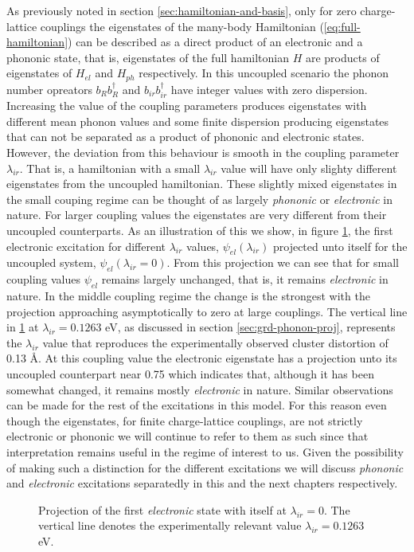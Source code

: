 As previously noted in section \ref{sec:hamiltonian-and-basis}, only for zero charge-lattice couplings the eigenstates of the many-body Hamiltonian (\ref{eq:full-hamiltonian}) can be described as a direct product of an electronic and a phononic state, that is, eigenstates of the full hamiltonian $H$ are products of eigenstates of $H_{el}$ and $H_{ph}$ respectively.
In this uncoupled scenario the phonon number opreators $b_Rb^\dagger_R$ and $b_{ir}b^\dagger_{ir}$ have integer values with zero dispersion.
Increasing the value of the coupling parameters produces eigenstates with different mean phonon values and some finite dispersion producing eigenstates that can not be separated as a product of phononic and electronic states.
However, the deviation from this behaviour is smooth in the coupling parameter $\lambda_{ir}$.
That is, a hamiltonian with a small $\lambda_{ir}$ value will have only slighty different eigenstates from the uncoupled hamiltonian.
These slightly mixed eigenstates in the small couping regime can be thought of as largely \textit{phononic} or \textit{electronic} in nature.
For larger coupling values the eigenstates are very different from their uncoupled counterparts.
As an illustration of this we show, in figure \ref{fig:electr-proj}, the first electronic excitation for different $\lambda_{ir}$ values, $\psi_{el}(\lambda_{ir})$ projected unto itself for the uncoupled system, $\psi_{el}(\lambda_{ir}=0)$.
From this projection we can see that for small coupling values $\psi_{el}$ remains largely unchanged, that is, it remains \textit{electronic} in nature.
In the middle coupling regime the change is the strongest with the projection approaching asymptotically to zero at large couplings.
The vertical line in \ref{fig:electr-proj} at $\lambda_{ir}=0.1263$ eV, as discussed in section \ref{sec:grd-phonon-proj}, represents the $\lambda_{ir}$ value that reproduces the experimentally observed cluster distortion of 0.13 \AA.
At this coupling value the electronic eigenstate has a projection unto its uncoupled counterpart near 0.75 which indicates that, although it has been somewhat changed, it remains mostly \textit{electronic} in nature.
Similar observations can be made for the rest of the excitations in this model.
For this reason even though the eigenstates, for finite charge-lattice couplings, are not strictly electronic or phononic we will continue to refer to them as such since that interpretation remains useful in the regime of interest to us.
Given the possibility of making such a distinction for the different excitations we will discuss \textit{phononic} and \textit{electronic} excitations separatedly in this and the next chapters respectively. 
%
\begin{figure}[ht]
  \centering
  
  \caption[Projection of the first \textit{electronic} state with itself at $\lambda_{ir}=0$.]
  {Projection of the first \textit{electronic} state with itself at $\lambda_{ir}=0$.
    The vertical line denotes the experimentally relevant value $\lambda_{ir}=0.1263$ eV.}
  \label{fig:electr-proj}
\end{figure}

